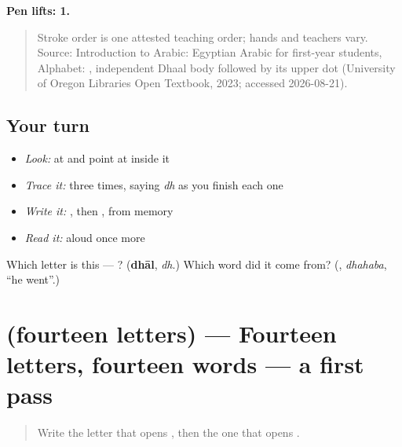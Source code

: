 \textbf{Pen lifts: 1.}

\begin{quote}
Stroke order is one attested teaching order; hands and teachers vary. Source: Introduction to Arabic: Egyptian Arabic for first-year students, Alphabet:   , independent Dhaal body followed by its upper dot (University of Oregon Libraries Open Textbook, 2023; accessed 2026-08-21).
\end{quote}

\subsection*{Your turn}
\begin{itemize}
\raggedright
  \item \emph{Look:} at \textbf{} and point at  inside it
  \item \emph{Trace it:}  three times, saying \emph{dh} as you finish each one
  \item \emph{Write it:} , then , from memory
  \item \emph{Read it:} \textbf{} aloud once more
\end{itemize}

\begin{tcolorbox}[breakable,colback=teal!4,colframe=teal!35!black,title={Before you move on}]
Which letter is this — ? (\textbf{dhāl}, \emph{dh}.) Which word did it come from? (\textbf{}, \emph{dhahaba}, \textquotedblleft{}he went\textquotedblright{}.)
\end{tcolorbox}
\section[(fourteen letters)]{(fourteen letters) — Fourteen letters, fourteen words — a first pass}

\label{lesson:AR-R49-letters-first-pass}



\begin{quote}
Write the letter that opens , then the one that opens .
\end{quote}

